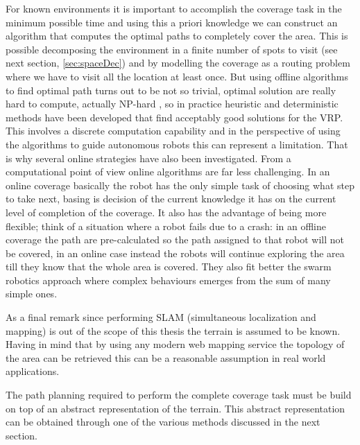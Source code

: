 For known environments it is important to accomplish the coverage task in the minimum possible time and using this a priori knowledge we can construct an algorithm that computes the optimal paths to completely cover the area. This is possible decomposing the environment in a finite number of spots to visit (see next section, \ref{sec:spaceDec}) and by modelling the coverage as a routing problem where we have to visit all the location at least once. But using offline algorithms to find optimal path turns out to be not so trivial, optimal solution are really hard to compute, actually NP-hard \cite{wiki:VRP}, so in practice heuristic and deterministic methods have been developed that find acceptably good solutions for the VRP. This involves a discrete computation capability and in the perspective of using the algorithms to guide autonomous robots this can represent a limitation. That is why several online strategies have also been investigated.
From a computational point of view online algorithms are far less challenging. In an online coverage basically the robot has the only simple task of choosing what step to take next, basing is decision of the current knowledge it has on the current level of completion of the coverage. It also has the advantage of being more flexible; think of a situation where a robot fails due to a crash: in an offline coverage the path are pre-calculated so the path assigned to that robot will not be covered, in an online case instead the robots will continue exploring the area till they know that the whole area is covered. They also fit better the swarm robotics approach where complex behaviours emerges from the sum of many simple ones.

As a final remark since performing SLAM (simultaneous localization and mapping) is out of the scope of this thesis the terrain is assumed to be known. Having in mind that by using any modern web mapping service the topology of the area can be retrieved this can be a reasonable assumption in real world applications.

The path planning required to perform the complete coverage task must be build on top of an abstract representation of the terrain. This abstract representation can be obtained through one of the various methods discussed in the next section.

